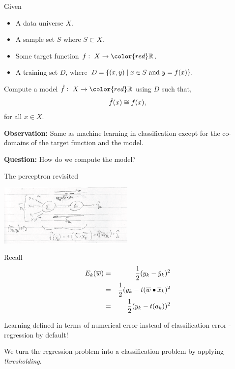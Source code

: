 \documentclass[a4paper,blends,pdf,colorBG,slideColor]{prosper}
\begin{document}
Given
\begin{itemize}
\item A data universe $X$.
\item A sample set $S$ where $S \subset X$.
\item Some target function $f\co X \rightarrow {\color{red}\Real}$.
\item A training set $D$, where
$
D = \{ (x ,y) \mid x \in S \text{ and } y = f(x)\}.
$
\end{itemize}
Compute a model $\model{f}\co X \rightarrow {\color{red}\Real}$ using $D$ such that,
\begin{equation*}
\hat{f}(x) \cong f(x),
\end{equation*}
for all $x \in X$.

\vspace{.1in}

{\bf Observation:}  Same as machine learning in classification except for the co-domains 
of the target function and the model.

{\bf Question:} How do we compute the model?

\es


The perceptron revisited
\begin{center}
\includegraphics[height=30mm]{images/perceptron-revisited.eps}
\end{center}
\es

Recall
\begin{eqnarray*}
E_k(\overline{w}) &=& \frac{1}{2}(y_k - \hat{y}_k)^2\\
	&=& \frac{1}{2}(y_k-t(\overline{w}\bullet\overline{x}_k)^2\\
	&=& \frac{1}{2}(y_k-t(a_k))^2
\end{eqnarray*}

Learning defined in terms of numerical error instead of classification error - regression by default!

We turn the regression problem into a classification problem by applying {\em thresholding}.
\es
\end{document}

